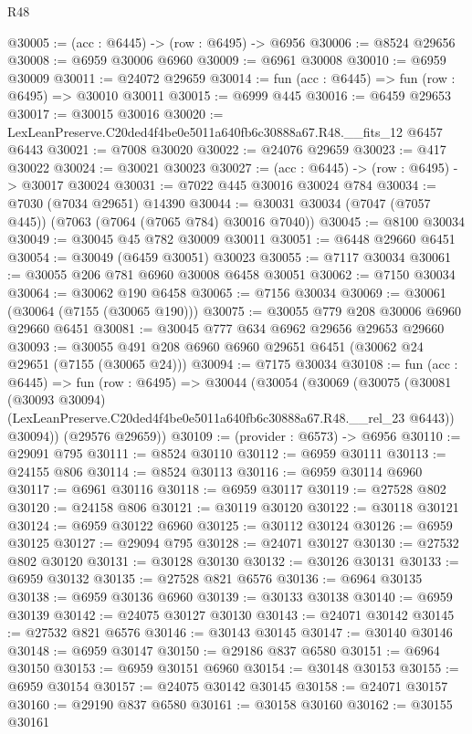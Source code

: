 \begin{lexlean}{R48}
\begin{coremodule}
@30005 := (acc : @6445) -> (row : @6495) -> @6956
@30006 := @8524 @29656
@30008 := @6959 @30006 @6960
@30009 := @6961 @30008
@30010 := @6959 @30009
@30011 := @24072 @29659
@30014 := fun (acc : @6445) => fun (row : @6495) => @30010 @30011
@30015 := @6999 @445
@30016 := @6459 @29653
@30017 := @30015 @30016
@30020 := LexLeanPreserve.C20ded4f4be0e5011a640fb6c30888a67.R48.__fits_12 @6457 @6443
@30021 := @7008 @30020
@30022 := @24076 @29659
@30023 := @417 @30022
@30024 := @30021 @30023
@30027 := (acc : @6445) -> (row : @6495) -> @30017 @30024
@30031 := @7022 @445 @30016 @30024 @784
@30034 := @7030 (@7034 @29651) @14390
@30044 := @30031 @30034 (@7047 (@7057 @445)) (@7063 (@7064 (@7065 @784) @30016 @7040))
@30045 := @8100 @30034
@30049 := @30045 @45 @782 @30009 @30011
@30051 := @6448 @29660 @6451
@30054 := @30049 (@6459 @30051) @30023
@30055 := @7117 @30034
@30061 := @30055 @206 @781 @6960 @30008 @6458 @30051
@30062 := @7150 @30034
@30064 := @30062 @190 @6458
@30065 := @7156 @30034
@30069 := @30061 (@30064 (@7155 (@30065 @190)))
@30075 := @30055 @779 @208 @30006 @6960 @29660 @6451
@30081 := @30045 @777 @634 @6962 @29656 @29653 @29660
@30093 := @30055 @491 @208 @6960 @6960 @29651 @6451 (@30062 @24 @29651 (@7155 (@30065 @24)))
@30094 := @7175 @30034
@30108 := fun (acc : @6445) =>
  fun (row : @6495) =>
  @30044
    (@30054
      (@30069
        (@30075
          (@30081
            (@30093 @30094)
            (LexLeanPreserve.C20ded4f4be0e5011a640fb6c30888a67.R48.__rel_23 @6443))
          @30094))
      (@29576 @29659))
@30109 := (provider : @6573) -> @6956
@30110 := @29091 @795
@30111 := @8524 @30110
@30112 := @6959 @30111
@30113 := @24155 @806
@30114 := @8524 @30113
@30116 := @6959 @30114 @6960
@30117 := @6961 @30116
@30118 := @6959 @30117
@30119 := @27528 @802
@30120 := @24158 @806
@30121 := @30119 @30120
@30122 := @30118 @30121
@30124 := @6959 @30122 @6960
@30125 := @30112 @30124
@30126 := @6959 @30125
@30127 := @29094 @795
@30128 := @24071 @30127
@30130 := @27532 @802 @30120
@30131 := @30128 @30130
@30132 := @30126 @30131
@30133 := @6959 @30132
@30135 := @27528 @821 @6576
@30136 := @6964 @30135
@30138 := @6959 @30136 @6960
@30139 := @30133 @30138
@30140 := @6959 @30139
@30142 := @24075 @30127 @30130
@30143 := @24071 @30142
@30145 := @27532 @821 @6576
@30146 := @30143 @30145
@30147 := @30140 @30146
@30148 := @6959 @30147
@30150 := @29186 @837 @6580
@30151 := @6964 @30150
@30153 := @6959 @30151 @6960
@30154 := @30148 @30153
@30155 := @6959 @30154
@30157 := @24075 @30142 @30145
@30158 := @24071 @30157
@30160 := @29190 @837 @6580
@30161 := @30158 @30160
@30162 := @30155 @30161

\end{coremodule}
\end{lexlean}
